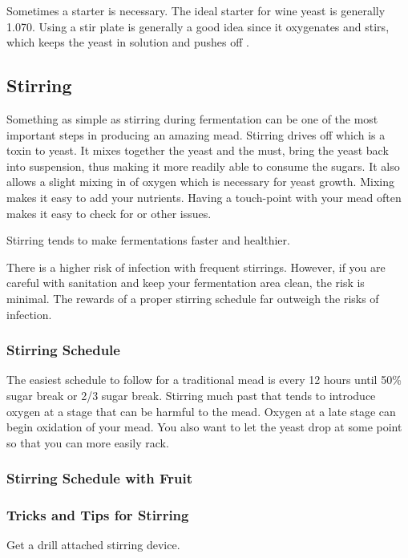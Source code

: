 \documentclass{article}
\begin{document}
  Sometimes a starter is necessary. The ideal starter for wine yeast is generally 1.070. Using a stir plate is 
  generally a good idea since it oxygenates and stirs, which keeps the yeast in solution and pushes off .

 \subsection{Stirring}
  Something as simple as stirring during fermentation can be one of the most important steps in producing an 
  amazing mead. Stirring drives off  which is a toxin to yeast. It mixes together the yeast and the must, 
  bring the yeast back into suspension, thus making it more readily able to consume the sugars. It also
  allows a slight mixing in of oxygen which is necessary for yeast growth. Mixing makes it easy to add your 
  nutrients. Having a touch-point with your mead often makes it easy to check for  or other issues.

  Stirring tends to make fermentations faster and healthier. 

  There is a higher risk of infection with frequent stirrings. However, if you are careful with sanitation and 
  keep your fermentation area clean, the risk is minimal. The rewards of a proper stirring schedule far outweigh 
  the risks of infection.

  \subsubsection{Stirring Schedule}
   The easiest schedule to follow for a traditional mead is every 12 hours until 50\% sugar break or 2/3 sugar 
   break. Stirring much past that tends to introduce oxygen at a stage that can be harmful to the mead. 
   Oxygen at a late stage can begin oxidation of your mead.
   You also want to let the yeast drop at some point so that you can more easily rack.

  \subsubsection{Stirring Schedule with Fruit}

  \subsubsection{Tricks and Tips for Stirring}
   Get a drill attached stirring device.
\end{document}
